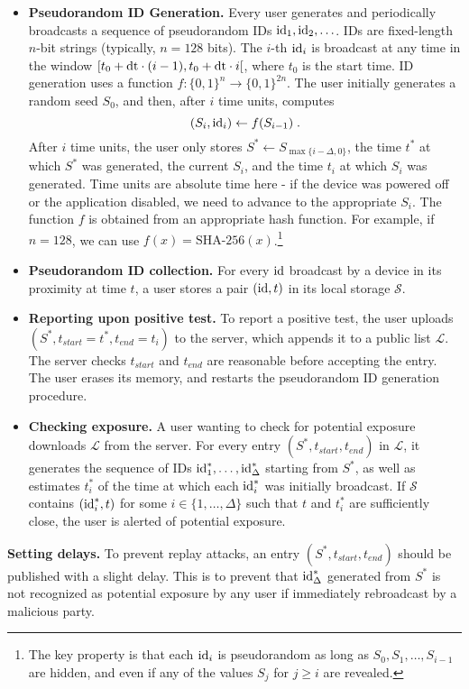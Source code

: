 \documentclass{article}
\newcommand{\TODO}[1]{ {\color{blue} #1 }}
\begin{document}
\begin{itemize}
    \item {\bf Pseudorandom ID Generation.} Every user generates and periodically broadcasts a sequence of pseudorandom IDs $\mathrm{id}_1, \mathrm{id}_2, \ldots$. IDs are fixed-length $n$-bit strings (typically, $n = 128$ bits). The $i$-th $\mathrm{id}_i$ is broadcast at any time in the window $[t_0 + \mathrm{dt}\cdot (i-1), t_0 + \mathrm{dt}\cdot i[$, where $t_0$ is the start time. ID generation uses a function $f: \{0,1\}^n \to \{0,1\}^{2n}$. The user initially generates a random seed $S_0$, and then, after $i$ time units, computes
\begin{displaymath}
(S_i, \mathrm{id}_i) \gets f(S_{i-1}) \;.
\end{displaymath}
After $i$ time units, the user only stores $S^* \gets S_{\max\{i-\Delta,0\}}$, the time $t^*$ at which $S^*$ was generated, the current $S_i$, and the time $t_i$ at which $S_i$ was generated. Time units are absolute time here - if the device was powered off or the application disabled, we need to advance to the appropriate $S_i$. The function $f$ is obtained from an appropriate hash function. For example, if $n = 128$, we can use $f(x) = \textrm{SHA-256}(x)$.\footnote{The key property is that each $\mathrm{id}_i$ is pseudorandom  as long as $S_0, S_1, \ldots, S_{i-1}$ are hidden, and even if any of the values $S_j$ for $j \geq i$ are revealed.}

\item {\bf Pseudorandom ID collection.} For every $\mathrm{id}$ broadcast by a device in its proximity at time $t$, a user stores a pair $(\mathrm{id}, t)$ in its local storage $\mathcal{S}$.
\item {\bf Reporting upon positive test.} To report a positive test, the user uploads $(S^*, t_{start}=t^*, t_{end}=t_i)$ to the server, which appends it to a public list $\mathcal{L}$. The server checks $t_{start}$ and $t_{end}$ are reasonable before accepting the entry. The user erases its memory, and restarts the pseudorandom ID generation procedure.
\item {\bf Checking exposure.} A user wanting to check for potential exposure downloads $\mathcal{L}$ from the server. For every entry $(S^*,t_{start}, t_{end})$ in $\mathcal{L}$, it generates the sequence of IDs $\mathrm{id}^*_1, \ldots, \mathrm{id}^*_{\Delta}$ starting from $S^*$, as well as  estimates $t_i^*$ of the time at which each $\mathrm{id}_i^*$ was initially broadcast. If $\mathcal{S}$ contains $(\mathrm{id}_i^*, t)$ for some $i \in \{1, \ldots, \Delta\}$ such that $t$ and $t_i^*$ are sufficiently close, the user is alerted of potential exposure.
\end{itemize}
{\bf Setting delays.} To prevent replay attacks, an entry $(S^*,t_{start}, t_{end})$ should be published with a slight delay. This is to prevent that $\mathrm{id}^*_{\Delta}$ generated from $S^*$ is not recognized as potential exposure by any user if immediately rebroadcast by a malicious party.
\end{document}
